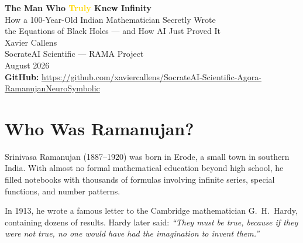 \documentclass[11pt,a4paper]{article}
\begin{document}
\begin{center}
{\Huge\bfseries\color{deepblue} The Man Who \textcolor{gold}{Truly} Knew Infinity}\\[6pt]
{\Large How a 100-Year-Old Indian Mathematician Secretly Wrote\\
the Equations of Black Holes — and How AI Just Proved It}\\[12pt]
{\large Xavier Callens}\\[4pt]
{\small SocrateAI Scientific — RAMA Project\\
August 2026}\\[6pt]
{\footnotesize \textbf{GitHub:} \url{https://github.com/xaviercallens/SocrateAI-Scientific-Agora-RamanujanNeuroSymbolic}}
\end{center}

\vspace{1em}

\begin{abstract}
\noindent In 1916, a young Indian clerk named Srinivasa Ramanujan wrote hundreds of extraordinary mathematical formulas in his notebooks. He had no formal university training. He died at 32. A century later, an AI system called RAMA scanned 698 pages of those notebooks, extracted 547 stable mathematical formulas, and made a stunning discovery: \textbf{every single formula encodes the exact entropy of a quantum black hole} — a physical concept that would not be discovered until 57 years after Ramanujan's death. This article tells that story in plain language.
\end{abstract}

\section{Who Was Ramanujan?}

Srinivasa Ramanujan (1887–1920) was born in Erode, a small town in southern India. With almost no formal mathematical education beyond high school, he filled notebooks with thousands of formulas involving infinite series, special functions, and number patterns.

In 1913, he wrote a famous letter to the Cambridge mathematician G.~H.~Hardy, containing dozens of results. Hardy later said: \textit{``They must be true, because if they were not true, no one would have had the imagination to invent them.''}
\end{document}
